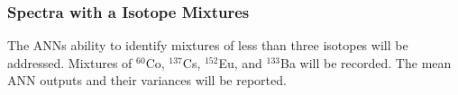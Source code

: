 \subsubsection{Spectra with a Isotope Mixtures}


The ANNs ability to identify mixtures of less than three isotopes will be addressed. Mixtures of $^{60}$Co, $^{137}$Cs, $^{152}$Eu, and $^{133}$Ba will be recorded. The mean ANN outputs and their variances will be reported.
